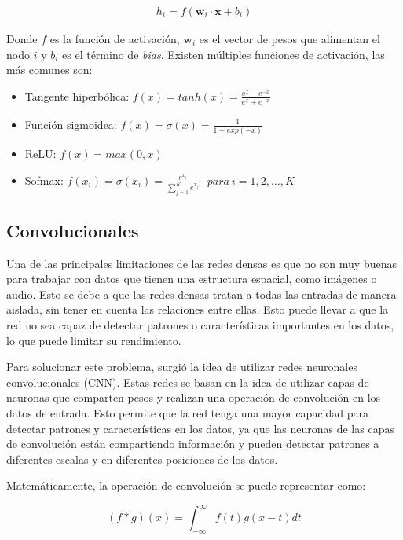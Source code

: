 \begin{align}
    h_i = f(\mathbf{w}_i \cdot \mathbf{x} + b_i)
\end{align}

Donde $f$ es la función de activación, $\mathbf{w}_i$ es el vector de pesos que alimentan el nodo $i$ y $b_i$ es el
término de {\it bias}. Existen múltiples funciones de activación, las más comunes son:

\begin{itemize}
    \item Tangente hiperbólica: $f(x) = tanh(x) = \frac{e^x - e^{-x}}{e^x + e^{-x}}$
    \item Función sigmoidea: $f(x) = \sigma(x) = \frac{1}{1+exp(-x)}$
    \item ReLU: $f(x) = max(0, x)$
    \item Sofmax: $f(x_i) = \sigma(x_i) = \frac{e^{x_{i}}}{\sum_{j=1}^K e^{x_{j}}} \ \ \ para\ i=1,2,\dots,K$
\end{itemize}

\subsection{Convolucionales}
Una de las principales limitaciones de las redes densas es que no son muy buenas para trabajar con datos que tienen una
estructura espacial, como imágenes o audio. Esto se debe a que las redes densas tratan a todas las entradas de manera
aislada, sin tener en cuenta las relaciones entre ellas. Esto puede llevar a que la red no sea capaz de detectar
patrones o características importantes en los datos, lo que puede limitar su rendimiento.

Para solucionar este problema, surgió la idea de utilizar redes neuronales convolucionales (CNN). Estas redes se basan
en la idea de utilizar capas de neuronas que comparten pesos y realizan una operación de convolución en los datos de
entrada. Esto permite que la red tenga una mayor capacidad para detectar patrones y características en los datos, ya
que las neuronas de las capas de convolución están compartiendo información y pueden detectar patrones a diferentes
escalas y en diferentes posiciones de los datos.

Matemáticamente, la operación de convolución se puede representar como:

\begin{equation}
    (f * g)(x) = \int_{-\infty}^{\infty} f(t)g(x-t) dt
    \label{eq:convolucion}
\end{equation}


